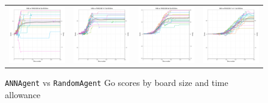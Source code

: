 \begin{figure}
\begin{tabular}{cccc}
\hspace{-0.5cm}\includegraphics[width = 1.55in]{images/Visualizations/ANNvsRANDOM/8000ms5x5.png} &
\hspace{-0.5cm}\includegraphics[width = 1.55in]{images/Visualizations/ANNvsRANDOM/8000ms7x7.png} &
\hspace{-0.5cm}\includegraphics[width = 1.55in]{images/Visualizations/ANNvsRANDOM/8000ms9x9.png} &
\hspace{-0.5cm}\includegraphics[width = 1.55in]{images/Visualizations/ANNvsRANDOM/8000ms11x11.png} \\
\end{tabular}
\caption{\texttt{ANNAgent} vs \texttt{RandomAgent} Go scores by board size and time allowance}
\label{app:annrandscore}
\end{figure}

